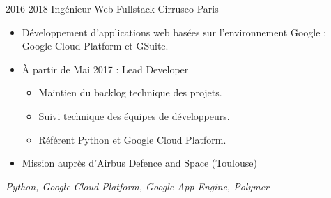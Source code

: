 \cventry
    {2016-2018}
    {Ingénieur Web Fullstack}
    {}
    {Cirruseo}
    {Paris}
    {
        \begin{itemize}
            \item Développement d'applications web basées sur l'environnement Google : Google Cloud Platform et GSuite.
            \item À partir de Mai 2017 : Lead Developer
            \begin{itemize}
                \item Maintien du backlog technique des projets.
                \item Suivi technique des équipes de développeurs.
                \item Référent Python et Google Cloud Platform.
            \end{itemize}
            \item Mission auprès d'Airbus Defence and Space (Toulouse)
        \end{itemize}
        \textit{Python, Google Cloud Platform, Google App Engine, Polymer}
    }
\vspace*{0.2cm}
